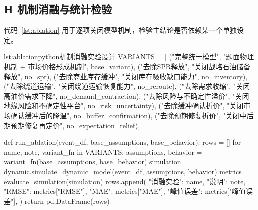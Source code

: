 \subsection*{H 机制消融与统计检验}

代码~\ref{lst:ablation} 用于逐项关闭模型机制，检验主结论是否依赖某一个单独设定。

\begin{paperlisting}{lst:ablation}{python}{机制消融实验设计}
VARIANTS = [
    ("完整统一模型", "题面物理机制 + 市场价格形成机制", base_variant),
    ("去除SPR释放", "关闭战略石油储备释放", no_spr),
    ("去除商业库存缓冲", "关闭库存吸收缺口能力", no_inventory),
    ("去除绕道运输", "关闭绕道运输恢复能力", no_reroute),
    ("去除需求收缩", "关闭高油价需求下降", no_demand_contraction),
    ("去除风险与不确定性溢价", "关闭地缘风险和不确定性平台", no_risk_uncertainty),
    ("去除缓冲确认折价", "关闭市场确认缓冲后的降温", no_buffer_confirmation),
    ("去除预期修复折价", "关闭中后期预期修复再定价", no_expectation_relief),
]

def run_ablation(event_df, base_assumptions, base_behavior):
    rows = []
    for name, note, variant_fn in VARIANTS:
        assumptions, behavior = variant_fn(base_assumptions, base_behavior)
        simulation = dynamic.simulate_dynamic_model(event_df, assumptions, behavior)
        metrics = evaluate_simulation(simulation)
        rows.append({
            "消融实验": name,
            "说明": note,
            "RMSE": metrics["RMSE"],
            "MAE": metrics["MAE"],
            "峰值误差": metrics["峰值误差"],
        })
    return pd.DataFrame(rows)
\end{paperlisting}

\clearpage
